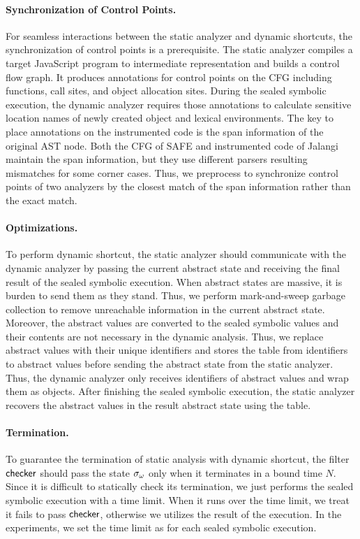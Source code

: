 \paragraph{Synchronization of Control Points.}
For seamless interactions between the static analyzer and dynamic shortcuts,
the synchronization of control points is a prerequisite.
The static analyzer compiles a target JavaScript program to intermediate
representation and builds a control flow graph.  It produces annotations for
control points on the CFG including functions, call sites, and object allocation
sites.  During the sealed symbolic execution, the dynamic analyzer requires
those annotations to calculate sensitive location names of newly created object
and lexical environments.  The key to place annotations on the instrumented code
is the span information of the original AST node.  Both the CFG of SAFE and
instrumented code of Jalangi maintain the span information, but they use
different parsers resulting mismatches for some corner cases.  Thus, we
preprocess to synchronize control points of two analyzers by the closest match
of the span information rather than the exact match.


\paragraph{Optimizations.}
To perform dynamic shortcut, the static analyzer should communicate with the
dynamic analyzer by passing the current abstract state and receiving the final
result of the sealed symbolic execution.  When abstract states are massive, it
is burden to send them as they stand.  Thus, we perform mark-and-sweep garbage
collection to remove unreachable information in the current abstract state.
Moreover, the abstract values are converted to the sealed symbolic values and
their contents are not necessary in the dynamic analysis.  Thus, we replace
abstract values with their unique identifiers and stores the table from
identifiers to abstract values before sending the abstract state
from the static analyzer.  Thus, the dynamic analyzer only receives identifiers
of abstract values and wrap them as  objects.  After finishing the
sealed symbolic execution, the static analyzer recovers the abstract values in
the result abstract state using the table.


\paragraph{Termination.}
To guarantee the termination of static analysis with dynamic shortcut, the
filter $\textsf{checker}$ should pass the state ${\sigma}_\omega$ only when it terminates in a
bound time $N$.  Since it is difficult to statically check its termination,
we just performs the sealed symbolic execution with a time limit.  When it runs
over the time limit, we treat it fails to pass $\textsf{checker}$, otherwise we utilizes
the result of the execution.  In the experiments, we set the time limit as
 for each sealed symbolic execution.


